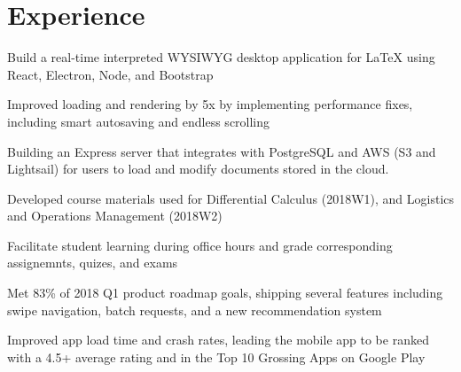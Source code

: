 \documentclass[]{deedy-resume-openfont}
\begin{document}
\begin{minipage}[t]{0.66\textwidth} 


\section{Experience}
\vspace{\topsep} %
\begin{tightemize}
\item Build a real-time interpreted WYSIWYG desktop application for LaTeX using React, Electron, Node, and Bootstrap
\item Improved loading and rendering by 5x by implementing performance fixes, including smart autosaving and endless scrolling
\item Building an Express server that integrates with PostgreSQL and AWS (S3 and Lightsail) for users to load and modify documents stored in the cloud.
\end{tightemize}
\sectionsep

\begin{tightemize}
\item Developed course materials used for Differential Calculus (2018W1), and Logistics and Operations Management (2018W2)
\item Facilitate student learning during office hours and grade corresponding assignemnts, quizes, and exams
\end{tightemize}
\sectionsep

\begin{tightemize}
\item Met 83\% of 2018 Q1 product roadmap goals, shipping several features including swipe navigation, batch requests, and a new recommendation system
\item Improved app load time and crash rates, leading the mobile app to be ranked with a 4.5+ average rating and in the Top 10 Grossing Apps on Google Play 
\end{tightemize}
\sectionsep



\end{minipage}
\end{document}
